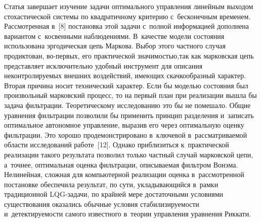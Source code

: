 \begin{multicols}{2}
     Статья завершает изучение задачи оптимального управ\-ле\-ния линейным 
выходом сто\-ха\-сти\-че\-ской сис\-те\-мы по квад\-ра\-тич\-но\-му критерию 
с~бесконечным временем. Рас\-смот\-рен\-ная в~[8] постановка этой задачи 
с~полной информацией дополнена вариантом с~косвенными наблюдениями. 
В~качестве модели со\-сто\-яния использована эргодическая цепь Маркова. 
Выбор этого част\-но\-го случая продиктован, во-пер\-вых, его практической 
значимостью,\linebreak так как марковская цепь представляет исключительно удобный 
инструмент для описания не\-конт\-ро\-ли\-ру\-емых внеш\-них воздействий, 
имеющих скачкообразный характер. Вторая причина носит \mbox{технический} 
характер. Если бы моделью со\-сто\-яния был произвольный марковский 
процесс, то на первый план при реализации вышла бы задача фильт\-ра\-ции. 
Теоретическому исследованию это бы не помешало. Общие уравнения 
фильт\-ра\-ции поз\-во\-ли\-ли бы применить принцип разделения и~записать 
оптимальное автономное управ\-ле\-ние, выразив его через оптимальную оценку 
фильт\-ра\-ции. Это хорошо продемонстрировано в~ключевой 
в~рас\-смат\-ри\-ва\-емой об\-ласти исследований работе~[12]. Однако 
при\-бли\-зить\-ся к~практической реализации такого результата позволил только 
част\-ный случай марковской цепи, а~точ\-нее, оптимальная оценка фильт\-ра\-ции, 
описываемая фильтром Вонэма. Нелинейная, слож\-ная для компьютерной 
реализации оценка в~рас\-смот\-рен\-ной по\-ста\-нов\-ке обеспечила результат, по 
сути, укла\-ды\-ва\-ющий\-ся в~рамки традиционной LQG-за\-да\-чи, по крайней 
мере достаточными условиями существования оказались обычные условия 
ста\-би\-ли\-зи\-ру\-е\-мости и~де\-тек\-ти\-ру\-е\-мости самого известного в~теории 
управ\-ле\-ния уравнения Риккати.




\end{multicols}
